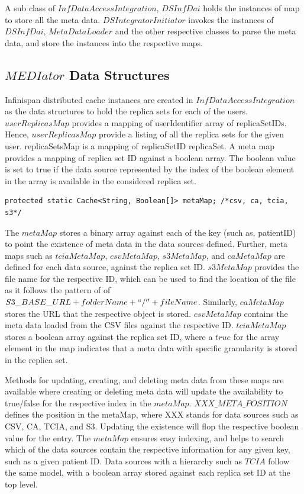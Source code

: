 \documentclass[letterpaper, 10 pt, conference]{ieeeconf}  %
\begin{document}
A sub class of $InfDataAccessIntegration$, $DSInfDai$ holds the instances of map to store all the meta data. $DSIntegratorInitiator$ invokes the instances of $DSInfDai$, $MetaDataLoader$ and the other respective classes to parse the meta data, and store the instances into the respective maps. 

\subsection{$MEDIator$ Data Structures}
Infinispan distributed cache instances are created in $InfDataAccessIntegration$ as the data structures to hold the replica sets for each of the users. $userReplicasMap$ provides a mapping of userIdentifier  array of replicaSetIDs. Hence, $userReplicasMap$ provide a listing of all the replica sets for the given user. replicaSetsMap is a mapping of replicaSetID  replicaSet. A meta map provides a  mapping of replica set ID against a boolean array. The boolean value is set to true if the data source represented by the index of the boolean element in the array is available in the considered replica set.

\vspace{-15pt}
\begin{lstlisting}  
protected static Cache<String, Boolean[]> metaMap; /*csv, ca, tcia, s3*/
\end{lstlisting} 


The $metaMap$ stores a binary array against each of the key (such as, patientID) to point the existence of meta data in the data sources defined. Further, meta maps such as $tciaMetaMap$, $csvMetaMap$, $s3MetaMap$, and $caMetaMap$ are defined for each data source, against the replica set ID. $s3MetaMap$ provides the file name for the respective ID, which can be used to find the location of the file as it follows the pattern of of $S3\_BASE\_URL + folderName + ``/'' + fileName$. Similarly, $caMetaMap$ stores the URL that the respective object is stored. $csvMetaMap$ contains the meta data loaded from the CSV files against the respective ID. $tciaMetaMap$ stores a boolean array against the replica set ID, where a $true$ for the array element in the map indicates that a meta data with specific granularity is stored in the replica set.

Methods for updating, creating, and deleting meta data from these maps are available where creating or deleting meta data will update the availability to true/false for the respective index in the $metaMap$. $XXX\_META\_POSITION$ defines the position in the metaMap, where XXX stands for data sources such as CSV, CA, TCIA, and S3. Updating the existence will flop the respective boolean value for the entry. The $metaMap$ ensures easy indexing, and helps to search which of the data sources contain the respective information for any given key, such as a given patient ID. Data sources with a hierarchy such as $TCIA$ follow the same model, with a boolean array stored against each replica set ID at the top level.
\end{document}
